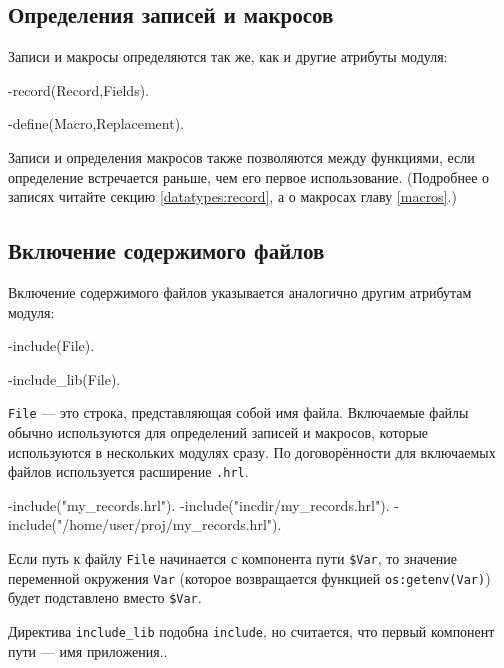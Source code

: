 \subsection{Определения записей и макросов}

Записи и макросы определяются так же, как и другие атрибуты модуля:

\begin{erlang}
-record(Record,Fields).

-define(Macro,Replacement).
\end{erlang}

Записи и определения макросов также позволяются между функциями, если определение
встречается раньше, чем его первое использование. (Подробнее о записях читайте 
секцию \ref{datatypes:record}, а о макросах главу \ref{macros}.)



\subsection{Включение содержимого файлов}

Включение содержимого файлов указывается аналогично другим атрибутам модуля:

\begin{erlang}
-include(File).

-include_lib(File).
\end{erlang}

\texttt{File} --- это строка, представляющая собой имя файла. Включаемые файлы 
обычно используются для определений записей и макросов, которые используются
в нескольких модулях сразу. По договорённости для включаемых файлов используется
расширение \texttt{.hrl}.

\begin{erlang}
-include("my_records.hrl").
-include("incdir/my_records.hrl").
-include("/home/user/proj/my_records.hrl").
\end{erlang}

Если путь к файлу \texttt{File} начинается с компонента пути \texttt{\$Var}, то
значение переменной окружения \texttt{Var} (которое возвращается функцией
\texttt{os:getenv(Var)}) будет подставлено вместо \texttt{\$Var}.


Директива \texttt{include\_lib} подобна \texttt{include}, но считается, что 
первый компонент пути --- имя приложения..

